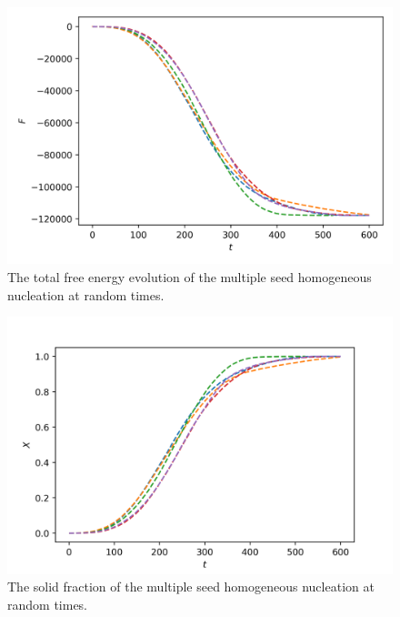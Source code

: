 \documentclass[preprint,12pt]{elsarticle}
\begin{document}
%
\begin{center}
\begin{figure} 
\begin{centering}
\includegraphics[scale=0.65]{free_energy_multiple_seed_randt.PNG}
\par\end{centering}
\caption{The total free energy evolution of the multiple seed homogeneous nucleation at random times.} \label{fig:free_energy_multiple_seed_randt}
\end{figure}
\par\end{center}
%
\begin{center}
\begin{figure} 
\begin{centering}
\includegraphics[scale=0.65]{solid_fraction_multiple_seed_randt.PNG}
\par\end{centering}
\caption{The solid fraction of the multiple seed homogeneous nucleation at random times.}  \label{fig:solid_fraction_multiple_seed_randt}
\end{figure}
\par\end{center}
\end{document}

